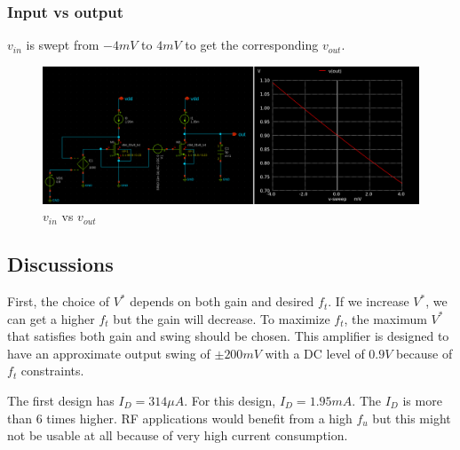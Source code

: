 \documentclass[conference]{IEEEtran}
\begin{document}
\subsubsection{Input vs output}
$v_{in}$ is swept from $-4mV$ to $4mV$ to get the corresponding $v_{out}$. 
\begin{figure}[H]
	\centering 
	\includegraphics[width=\columnwidth]{vinvout.png}
	\caption{$v_{in}$ vs $v_{out}$}
	\label{vinvout-2}	
\end{figure}

\subsection{Discussions}
First, the choice of $V^*$ depends on both gain and desired $f_t$. If we increase $V^*$, we 
can get a higher $f_t$ but the gain will decrease. To maximize $f_t$, the maximum $V^*$ that 
satisfies both gain and swing should be chosen. This amplifier is designed to have an approximate output swing of $\pm 200mV$ with a DC level of $0.9V$ because of $f_t$ constraints. 

\vspace{8pt}
The first design has $I_D = 314\mu A$. For this design, $I_D=1.95mA$. The $I_D$ is more than 6 times higher. RF applications would benefit from a high $f_u$ but this might not be usable at all because of very high current consumption. 
\end{document}

